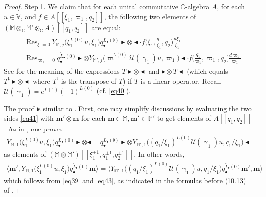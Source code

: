 \documentclass[11pt,b5paper,notitlepage]{article}
\theoremstyle{definition}
\theoremstyle{plain}
\newcommand{\mc}{\mathcal}
\newcommand{\wtd}{\widetilde}
\newcommand{\tr}{\mathrm{t}} %
\newcommand{\Res}{\mathrm{Res}}
\newcommand{\mbf}{\mathbf}
\newcommand{\blt}{\bullet}
\newcommand{\Vbb}{\mathbb V}
\newcommand{\Mbb}{\mathbb M}
\newcommand{\Cbb}{\mathbb C}
\newcommand{\btl}{\blacktriangleleft}
\newcommand{\btr}{\blacktriangleright}
\newcommand{\<}{\left\langle}
\renewcommand{\>}{\right\rangle}
\newcommand{\bigbk}[1]{\big\langle {#1}\big\rangle}
\numberwithin{equation}{subsection}
\begin{document}
\begin{proof}
Step 1. We claim that for each unital commutative $\Cbb$-algebra $A$, for each   $u\in\Vbb$, and $f\in A[[\xi_1,\varpi_1,q_2]]$,  the following two elements of $(\Mbb\otimes_\Cbb\Mbb'\otimes_\Cbb A)[[q_1,q_2]]$ are equal:
\begin{align}\label{eq41}
\begin{aligned}
&\Res_{\xi_1=0}~Y_{\Mbb,j}\big(\xi_1^{L(0)}u,\xi_1\big)q_\blt^{\wtd L_\blt(0)}\btr\otimes \btl\cdot f\big(\xi_1,\frac{q_1}{\xi_1},q_2\big)\frac{d\xi_1}{\xi_1}\\
=&\Res_{\varpi_1=0}~q_\blt^{\wtd L_\blt(0)}\btr\otimes Y_{\Mbb',j}\big(\varpi_1^{L(0)}\mc U(\upgamma_1)u,\varpi_1\big)\btl\cdot f\big(\frac{q_1}{\varpi_1},\varpi_1,q_2\big)\frac{d\varpi_1}{\varpi_1}
\end{aligned}
\end{align}
See \cite[(10.2,10.3)]{Gui-sewingconvergence} for the meaning of the expressions $T\btr\otimes\btl$ and $\btr\otimes T\btl$ (which equals $T^\tr\btr\otimes\btl$ where $T^\tr$ is the transpose of $T$) if $T$ is a linear operator. Recall $\mc U(\upgamma_1)=e^{L(1)}(-1)^{L(0)}$ (cf. \eqref{eq40}).

The proof is similar to \cite[Lem. 10.2]{Gui-sewingconvergence}. First, one may simplify discussions by evaluating the two sides \eqref{eq41} with $\mbf m'\otimes\mbf m$ for each $\mbf m\in\Mbb,\mbf m'\in\Mbb'$ to get elements of $A[[q_1,q_2]]$. As in \cite[(10.13)]{Gui-sewingconvergence}, one proves
\begin{align}
Y_{\Mbb,1}\big(\xi_1^{L(0)}u,\xi_1\big)q_\blt^{\wtd L_\blt(0)}\btr\otimes \btl=q_\blt^{\wtd L_\blt(0)}\btr\otimes Y_{\Mbb',1}\big((q_1/\xi_1)^{L(0)}\mc U(\upgamma_1)u,q_1/\xi_1\big)\btl  \label{eq42}
\end{align}
as elements of $(\Mbb\otimes\Mbb')[[\xi_1^{\pm1},q_1^{\pm1},q_2^{\pm1}]]$. In other words,
\begin{align}
\bigbk{\mbf m',Y_{\Mbb,1}\big(\xi_1^{L(0)}u,\xi_1\big)q_\blt^{\wtd L_\blt(0)}\mbf m}=\bigbk{Y_{\Mbb',1}\big((q_1/\xi_1)^{L(0)}\mc U(\upgamma_1)u,q_1/\xi_1\big)q_\blt^{\wtd L_\blt(0)}\mbf m', \mbf m}
\end{align}
which follows from \eqref{eq39} and \eqref{eq43}, as indicated in the formulas before (10.13) of \cite{Gui-sewingconvergence}.


\end{proof}
\end{document}
